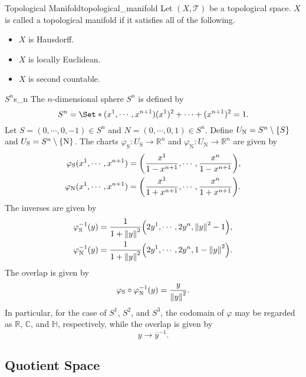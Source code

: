 \documentclass{article}
\begin{document}
\begin{definition}{Topological Manifold}{topological_manifold}
    Let $(X,\mathcal{T})$ be a topological space.
    $X$ is called a topological manifold if it satisfies all of the following.
    \begin{itemize}
        \item $X$ is Hausdorff.
        \item $X$ is locally Euclidean.
        \item $X$ is second countable.
    \end{itemize}
\end{definition}

\begin{example}{$S^n$}{s_n}
    The $n$-dimensional sphere $S^n$ is defined by
    \[ S^n = \Set*{(x^1,\cdots,x^{n+1})}{(x^1)^2 + \cdots + (x^{n+1})^2 = 1}. \]
    Let $S = (0,\cdots,0,-1) \in S^n$ and $N = (0,\cdots,0,1) \in S^n$.
    Define $U_{\mathrm{N}} = S^n \setminus \qty{S}$ and $U_{\mathrm{S}} = S^n \setminus \qty{\mathrm{N}}$.
    The charts $\varphi_{\mathrm{S}}: U_{\mathrm{S}} \rightarrow \mathbb{R}^n$ and $\varphi_{\mathrm{N}}: U_{\mathrm{N}}\rightarrow \mathbb{R}^n$ are given by
    \begin{align*}
        \varphi_{\mathrm{S}}(x^1,\cdots,x^{n+1}) &= \qty(\frac{x^1}{1-x^{n+1}},\cdots, \frac{x^n}{1-x^{n+1}}), \\
        \varphi_{\mathrm{N}}(x^1,\cdots,x^{n+1}) &= \qty(\frac{x^1}{1+x^{n+1}},\cdots, \frac{x^n}{1+x^{n+1}}).
    \end{align*}
    The inverses are given by
    \begin{align*}
        \varphi^{-1}_{\mathrm{S}}(y) &= \frac{1}{1+\norm{y}^2}\qty(2y^1,\cdots,2y^n,\norm{y}^2 - 1), \\
        \varphi^{-1}_{\mathrm{N}}(y) &= \frac{1}{1+\norm{y}^2}\qty(2y^1,\cdots,2y^n,1-\norm{y}^2).
    \end{align*}
    The overlap is given by
    \[ \varphi_{\mathrm{S}}\circ \varphi^{-1}_{\mathrm{N}}(y) = \frac{y}{\norm{y}^2}. \]
    In particular, for the case of $S^1$, $S^2$, and $S^3$, the codomain of $\varphi$ may be regarded as $\mathbb{R}$, $\mathbb{C}$, and $\mathbb{H}$, respectively, while the overlap is given by
    \[ y\rightarrow \overline{y}^{-1}. \]
\end{example}

\subsection{Quotient Space}
\end{document}
